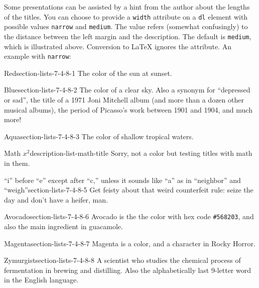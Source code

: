 \documentclass[pdflatex]{sn-jnl}
\theoremstyle{thmstyleone}%
\theoremstyle{thmstyletwo}%
\theoremstyle{thmstylethree}%
\newcommand{\mono}[1]{\texttt{#1}}
\numberwithin{equation}{section}
\begin{document}
%
\par
Some presentations can be assisted by a hint from the author about the lengths of the titles.  You can choose to provide a \mono{width} attribute on a \mono{dl} element with possible values \mono{narrow} and \mono{medium}. The value refers (somewhat confusingly) to the distance between the left margin and the description.  The default is \mono{medium}, which is illustrated above. Conversion to \LaTeX{} ignores the attribute.  An example with \mono{narrow}:%
\begin{descriptionlist}
\begin{dlinarrow}{Red}{section-lists-7-4-8-1}%
The color of the sun at sunset.%
\end{dlinarrow}%
\begin{dlinarrow}{Blue}{section-lists-7-4-8-2}%
The color of a clear sky. Also a synonym for ``depressed or sad'', the title of a 1971 Joni Mitchell album (and more than a dozen other musical albums), the period of Picasso's work between 1901 and 1904, and much more!%
\end{dlinarrow}%
\begin{dlinarrow}{Aqua}{section-lists-7-4-8-3}%
The color of shallow tropical waters.\footnotemark{}%
\end{dlinarrow}%
%
\begin{dlinarrow}{Math \(x^2\)}{description-list-math-title}%
Sorry, not a color but testing titles with math in them.%
\end{dlinarrow}%
\begin{dlinarrow}{``i'' before ``e'' except after ``c,'' unless it sounds like ``a'' as in ``neighbor'' and ``weigh''}{section-lists-7-4-8-5}%
Get feisty about that weird counterfeit rule: seize the day and don't have a heifer, man.%
\end{dlinarrow}%
\begin{dlinarrow}{Avocado}{section-lists-7-4-8-6}%
Avocado is the the color with hex code \mono{\#568203}, and also the main ingredient in guacamole.%
\end{dlinarrow}%
\begin{dlinarrow}{Magenta}{section-lists-7-4-8-7}%
Magenta is a color, and a character in Rocky Horror.%
\end{dlinarrow}%
\begin{dlinarrow}{Zymurgist}{section-lists-7-4-8-8}%
A scientist who studies the chemical process of fermentation in brewing and distilling.  Also the alphabetically last 9-letter word in the English language.%

\end{dlinarrow}
\end{descriptionlist}
\end{document}
